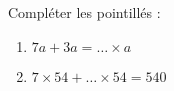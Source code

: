 
    \begin{mental}
        Compléter les pointillés :
        \begin{enumerate}
            \item
                \( 7a+3a=\ldots\times a\)
            \item
                \( 7\times 54+\ldots\times 54=540\)
        \end{enumerate}
    \end{mental}
